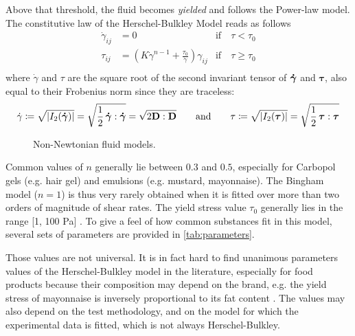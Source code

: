 \documentclass[11 pt]{report}
\begin{document}
Above that threshold, the fluid becomes \textit{yielded} and follows the Power-law model. The constitutive law of the Herschel-Bulkley Model reads as follows
\begin{equation}
    \begin{aligned}
        \dot \gamma_{ij} &= 0 & \text{if} \quad \tau < \tau_0\\
        \tau_{ij} &= \left(K \dot \gamma^{n-1} + \frac{\tau_0}{\dot \gamma}\right) \gamma_{ij} & \text{if} \quad \tau \geq \tau_0\\
    \end{aligned}
    \label{eq:herschel}
\end{equation}
where $\dot \gamma$ and $\tau$ are the square root of the second invariant tensor of $\boldsymbol{\dot \gamma}$ and $\boldsymbol\tau$, also equal to their Frobenius norm since they are traceless:
\begin{equation}
    \dot \gamma \coloneqq \sqrt{|I_2(\boldsymbol{\dot \gamma})|} = \sqrt{\frac{1}{2} \, \boldsymbol{\dot \gamma} : \boldsymbol{\dot \gamma}} = \sqrt{2 \mathbf{D} : \mathbf{D}} \qquad\text{and}\qquad
    \tau \coloneqq \sqrt{|I_2(\boldsymbol\tau)|} = \sqrt{\frac{1}{2} \, \boldsymbol\tau : \boldsymbol\tau}
    \label{eq:tensornorm}
\end{equation}


\begin{figure}[t]
    \centering
    
    \caption{Non-Newtonian fluid models.}
    \label{fig:fluid-classification}
\end{figure}

Common values of $n$ generally lie between $0.3$ and $0.5$, especially for Carbopol gels (e.g. hair gel) and emulsions (e.g. mustard, mayonnaise). The Bingham model ($n = 1$) is thus very rarely obtained when it is fitted over more than two orders of magnitude of shear rates. The yield stress value $\tau_0$ generally lies in the range [1, 100 Pa] \cite{Coussot}. To give a feel of how common substances fit in this model, several sets of parameters are provided in \cref{tab:parameters}.

Those values are not universal. It is in fact hard to find unanimous parameters values of the Herschel-Bulkley model in the literature, especially for food products because their composition may depend on the brand, e.g. the yield stress of mayonnaise is inversely proportional to its fat content \cite{mayonnaiseFat}. The values may also depend on the test methodology, and on the model for which the experimental data is fitted, which is not always Herschel-Bulkley.
\end{document}

